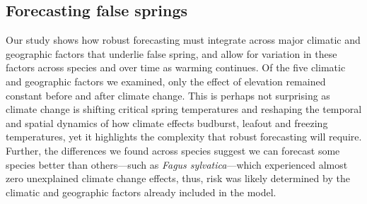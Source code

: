 \documentclass{article}\usepackage[]{graphicx}\usepackage[]{color}
\begin{document}
\subsection*{Forecasting false springs}
Our study shows how robust forecasting must integrate across major climatic and geographic factors that underlie false spring, and allow for variation in these factors across species and over time as warming continues. Of the five climatic and geographic factors we examined, only the effect of elevation remained constant before and after climate change. This is perhaps not surprising as climate change is shifting critical spring temperatures and reshaping the temporal and spatial dynamics of how climate effects budburst, leafout and freezing temperatures, yet it highlights the complexity that robust forecasting will require. Further, the differences we found across species suggest we can forecast some species better than others---such as \textit{Fagus sylvatica}---which experienced almost zero unexplained climate change effects, thus, risk was likely determined by the climatic and geographic factors already included in the model. %
\end{document}
